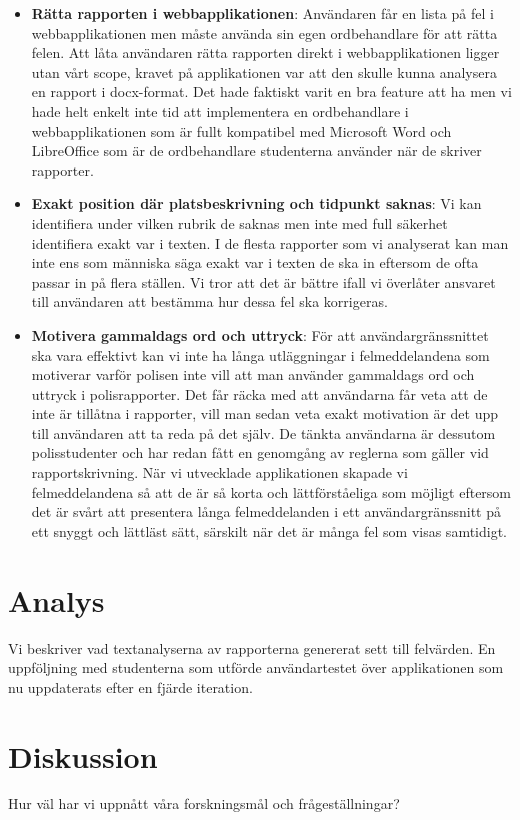 \documentclass[swedish]{maucsthesis}
\begin{document}
\begin{itemize}
\item \textbf{Rätta rapporten i webbapplikationen}: Användaren får en lista på
  fel i webbapplikationen men måste använda sin egen ordbehandlare för att rätta
  felen. Att låta användaren rätta rapporten direkt i webbapplikationen ligger
  utan vårt scope, kravet på applikationen var att den skulle kunna analysera en
  rapport i docx-format. Det hade faktiskt varit en bra feature att ha men vi
  hade helt enkelt inte tid att implementera en ordbehandlare i
  webbapplikationen som är fullt kompatibel med Microsoft Word och LibreOffice som
  är de ordbehandlare studenterna använder när de skriver rapporter.
\item \textbf{Exakt position där platsbeskrivning och tidpunkt saknas}: Vi kan
  identifiera under vilken rubrik de saknas men inte med full säkerhet
  identifiera exakt var i texten. I de flesta rapporter som vi analyserat kan
  man inte ens som människa säga exakt var i texten de ska in eftersom de
  ofta passar in på flera ställen. Vi tror att det är bättre ifall vi överlåter
  ansvaret till användaren att bestämma hur dessa fel ska korrigeras.
\item \textbf{Motivera gammaldags ord och uttryck}: För att användargränssnittet
  ska vara effektivt kan vi inte ha långa utläggningar i felmeddelandena som
  motiverar varför polisen inte vill att man använder gammaldags ord och uttryck
  i polisrapporter. Det får räcka med att användarna får veta att de inte är
  tillåtna i rapporter, vill man sedan veta exakt motivation är det upp till
  användaren att ta reda på det själv. De tänkta användarna är dessutom
  polisstudenter och har redan fått en genomgång av reglerna som gäller vid
  rapportskrivning. När vi utvecklade applikationen skapade vi felmeddelandena
  så att de är så korta och lättförståeliga som möjligt eftersom det är svårt
  att presentera långa felmeddelanden i ett användargränssnitt på ett snyggt och
  lättläst sätt, särskilt när det är många fel som visas samtidigt.
\end{itemize}

\section{Analys}
Vi beskriver vad textanalyserna av rapporterna genererat sett till felvärden. En
uppföljning med studenterna som utförde användartestet över applikationen som nu
uppdaterats efter en fjärde iteration.
\section{Diskussion}
Hur väl har vi uppnått våra forskningsmål och frågeställningar?
\end{document}
